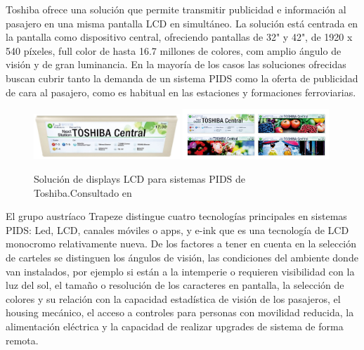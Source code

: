 Toshiba ofrece una solución que permite transmitir publicidad e información al pasajero en una misma pantalla LCD en simultáneo. La solución está centrada en la pantalla como dispositivo central, ofreciendo pantallas de 32" y 42", de 1920 x 540 píxeles, full color de hasta 16.7 millones de colores, com amplio ángulo de visión y de gran luminancia\citep{Toshiba}. En la mayoría de los casos las soluciones ofrecidas buscan cubrir tanto la demanda de un sistema PIDS como la oferta de publicidad de cara al pasajero, como es habitual en las estaciones y formaciones ferroviarias.\\



\begin{figure}[h]
	\centering
	\includegraphics[width=0.49\textwidth]{./Figures/ToshibaPIDS.jpg}
	\includegraphics[width=0.49\textwidth]{./Figures/ToshibaDisplayColorOpciones.jpg}
	\caption{Solución de displays LCD para sistemas PIDS de Toshiba.Consultado en \citep{Toshiba}}
	\label{fig:Toshiba}
\end{figure}


El grupo austríaco Trapeze \citep{Trapeze} distingue cuatro tecnologías principales en sistemas PIDS: Led, LCD, canales móviles o apps, y e-ink que es una tecnología de LCD monocromo relativamente nueva. De los factores a tener en cuenta en la selección de carteles se distinguen los ángulos de visión, las condiciones del ambiente donde van instalados, por ejemplo si están a la intemperie o requieren visibilidad con la luz del sol, el tamaño o resolución de los caracteres en pantalla, la selección de colores y su relación con la capacidad estadística de visión de los pasajeros, el housing mecánico, el acceso a controles para personas con movilidad reducida, la alimentación eléctrica y la capacidad de realizar upgrades de sistema de forma remota. \\ 


